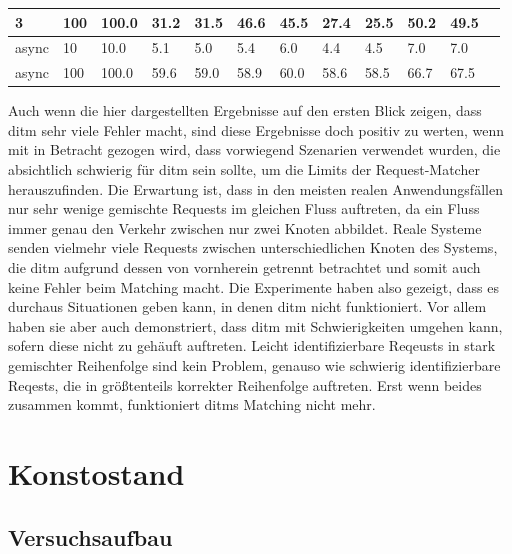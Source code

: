 \documentclass[12pt,a4paper]{report}
\begin{document}
\begin{table}[h]
\begin{tabular}{|l|l|l|l|l|l|l|l|l|l|l|l|}
		3                        & 100                                & 100.0                           & 31.2                        & 31.5                      & 46.6                           & 45.5   & 27.4 & 25.5   & 50.2 & 49.5   \\ \hline
		async                    & 10                                 & 10.0                            & 5.1                         & 5.0                       & 5.4                            & 6.0    & 4.4  & 4.5    & 7.0  & 7.0    \\ \hline
		async                    & 100                                & 100.0                           & 59.6                        & 59.0                      & 58.9                           & 60.0   & 58.6 & 58.5   & 66.7 & 67.5   \\ \hline
	\end{tabular}
\end{table}

Auch wenn die hier dargestellten Ergebnisse auf den ersten Blick zeigen, dass ditm sehr viele Fehler macht, sind diese Ergebnisse
doch positiv zu werten, wenn mit in Betracht gezogen wird, dass vorwiegend Szenarien verwendet wurden, die absichtlich schwierig
für ditm sein sollte, um die Limits der Request-Matcher herauszufinden. Die Erwartung ist, dass in den meisten realen Anwendungsfällen
nur sehr wenige gemischte Requests im gleichen Fluss auftreten, da ein Fluss immer genau den Verkehr zwischen nur zwei Knoten
abbildet. Reale Systeme senden vielmehr viele Requests zwischen unterschiedlichen Knoten des Systems, die ditm aufgrund
dessen von vornherein getrennt betrachtet und somit auch keine Fehler beim Matching macht. Die Experimente haben also gezeigt,
dass es durchaus Situationen geben kann, in denen ditm nicht funktioniert. Vor allem haben sie aber auch demonstriert, dass ditm
mit Schwierigkeiten umgehen kann, sofern diese nicht zu gehäuft auftreten. Leicht identifizierbare Reqeusts in stark gemischter
Reihenfolge sind kein Problem, genauso wie schwierig identifizierbare Reqests, die in größtenteils korrekter Reihenfolge
auftreten. Erst wenn beides zusammen kommt, funktioniert ditms Matching nicht mehr.

\section{Konstostand}
\subsection{Versuchsaufbau}
\end{document}
